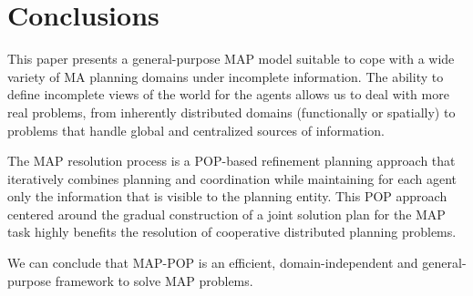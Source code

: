 \documentclass[12pt]{article}
\begin{document}
\section{Conclusions}

This paper presents a general-purpose MAP model suitable to cope with a wide variety of MA planning domains under incomplete information.
The ability to define incomplete views of the world for the agents allows us to deal with more real problems, from inherently distributed domains (functionally or spatially) to problems that handle global and centralized sources of information.

The MAP resolution process is a POP-based refinement planning approach that iteratively combines planning and coordination while maintaining for each agent only the information that is visible to the planning entity.
This POP approach centered around the gradual construction of a joint solution plan for the MAP task highly benefits the resolution of cooperative distributed planning problems.

We can conclude that MAP-POP is an efficient, domain-independent and general-purpose framework to solve MAP problems.

\newpage
\printbibliography
\end{document}
